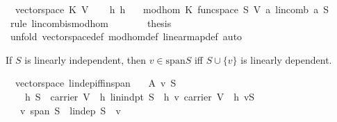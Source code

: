 \begin{isabellebody}
\ {}{\isacharcolon}\ {\isachardoublequoteopen}vectorspace\ K\ V{\isachardoublequoteclose}\isacommand{{\isachardot}{\isachardot}}\isamarkupfalse%
\isanewline
\ \ \isamarkupfalse%
\ h\ h{}\ \isamarkupfalse%
\ {}{\isacharcolon}\ {\isachardoublequoteopen}mod{\isacharunderscore}hom\ K\ {\isacharparenleft}func{\isacharunderscore}space\ S{\isacharparenright}\ V\ {\isacharparenleft}{\isasymlambda}a{\isachardot}\ lincomb\ a\ S{\isacharparenright}{\isachardoublequoteclose}\ \isamarkupfalse%
\ {\isacharparenleft}rule\ lincomb{\isacharunderscore}is{\isacharunderscore}mod{\isacharunderscore}hom{\isacharparenright}\isanewline
\ \ \isamarkupfalse%
\ {}\ {}\ \isamarkupfalse%
\ {\isacharquery}thesis\ \isamarkupfalse%
\ {\isacharparenleft}unfold\ vectorspace{\isacharunderscore}def\ mod{\isacharunderscore}hom{\isacharunderscore}def\ linear{\isacharunderscore}map{\isacharunderscore}def{\isacharcomma}\ auto{\isacharparenright}\isanewline
{}\isamarkupfalse%
%
\endisatagproof
{\isafoldproof}%
%
\isadelimproof
%
\endisadelimproof
%
\isamarkuptrue%
%
\begin{isamarkuptext}%
If $S$ is linearly independent, then $v\in \text{span}S$ iff $S\cup \{v\}$ is linearly 
dependent.%
\end{isamarkuptext}%
\isamarkuptrue%
\isamarkupfalse%
\ {\isacharparenleft}\ vectorspace{\isacharparenright}\ lin{\isacharunderscore}dep{\isacharunderscore}iff{\isacharunderscore}in{\isacharunderscore}span{\isacharcolon}\isanewline
\ \ \ A\ v\ S\isanewline
\ \ \ \ h{}{\isacharcolon}\ {\isachardoublequoteopen}S\ {\isasymsubseteq}\ carrier\ V{\isachardoublequoteclose}\ \ h{}{\isacharcolon}\ {\isachardoublequoteopen}lin{\isacharunderscore}indpt\ S{\isachardoublequoteclose}\ \ h{}{\isacharcolon}\ {\isachardoublequoteopen}v{\isasymin}\ carrier\ V{\isachardoublequoteclose}\ \ h{}{\isacharcolon}\ {\isachardoublequoteopen}v{\isasymnotin}S{\isachardoublequoteclose}\isanewline
\ \ \ {\isachardoublequoteopen}v{\isasymin}\ span\ S\ {\isasymlongleftrightarrow}\ lin{\isacharunderscore}dep\ {\isacharparenleft}S\ {\isasymunion}\ {\isacharbraceleft}v{\isacharbraceright}{\isacharparenright}{\isachardoublequoteclose}\isanewline
%

\end{isabellebody}
